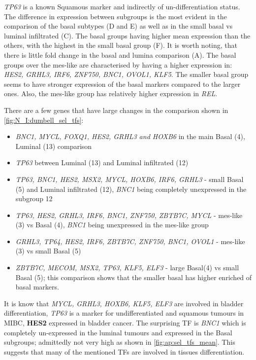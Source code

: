 \textit{TP63} is a known Squamous marker \citet{Robertson2023-na} and indirectly of un-differentiation status. The difference in expression between subgroups is the most evident in the comparison of the basal subtypes (D and E) as well as in the small basal vs luminal infiltrated (C). The basal groups having higher mean expression than the others, with the highest in the small basal group (F). It is worth noting, that there is little fold change in the basal and lumina comparison (A). The basal groups over the mes-like are characterised by having a higher expression in: \textit{HES2, GRHL3, IRF6, ZNF750, BNC1, OVOL1, KLF5}. The smaller basal group seems to have stronger expression of the basal markers compared to the larger ones. Also, the mes-like group has relatively higher expression in \textit{REL}.

There are a few genes that have large changes in the comparison shown in \cref{fig:N_I:dumbell_sel_tfs}: 
\begin{itemize}
    \item \textit{BNC1, MYCL, FOXQ1, HES2, GRHL3 and HOXB6} in the main Basal (4), Luminal (13) comparison
    \item \textit{TP63} between Luminal (13) and Luminal infiltrated (12)
    \item \textit{TP63, BNC1, HES2, MSX2, MYCL, HOXB6, IRF6, GRHL3} - small Basal (5) and Luminal infiltrated (12), \textit{BNC1} being completely unexpressed in the subgroup 12
    \item \textit{TP63, HES2, GRHL3, IRF6, BNC1, ZNF750, ZBTB7C, MYCL} - mes-like (3) vs Basal (4), \textit{BNC1} being unexpressed in the mes-like group
    \item \textit{GRHL3, TP64, HES2, IRF6, ZBTB7C, ZNF750, BNC1, OVOL1} - mes-like (3) vs small Basal (5) 
    \item \textit{ZBTB7C, MECOM, MSX2, TP63, KLF5, ELF3} - large Basal(4) vs small Basal (5); this comparison shows that the smaller basal has higher enriched of basal markers.
\end{itemize}


It is know that \textit{MYCL, GRHL3, HOXB6, KLF5, ELF3} are involved in bladder differentiation, \textit{TP63} is a marker for undifferentiated and squamous tumours in MIBC, \textbf{HES2} expressed in bladder cancer. The surprising TF is \textit{BNC1} which is completely un-expressed in the luminal tumours and expressed in the Basal subgroups; admittedly not very high as shown in \cref{fig:ap:sel_tfs_mean}. This suggests that many of the mentioned TFs are involved in tissues differentiation.

